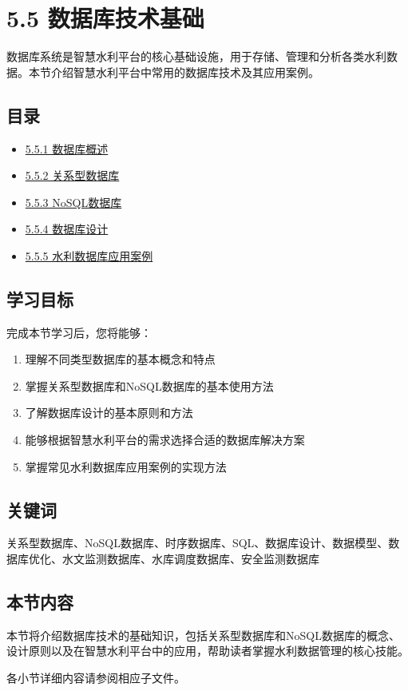 \section{5.5
数据库技术基础}\label{ux6570ux636eux5e93ux6280ux672fux57faux7840}

数据库系统是智慧水利平台的核心基础设施，用于存储、管理和分析各类水利数据。本节介绍智慧水利平台中常用的数据库技术及其应用案例。

\subsection{目录}\label{ux76eeux5f55}

\begin{itemize}
\tightlist
\item
  \href{section05-05/section05-05-01.md}{5.5.1 数据库概述}
\item
  \href{section05-05/section05-05-02.md}{5.5.2 关系型数据库}
\item
  \href{section05-05/section05-05-03.md}{5.5.3 NoSQL数据库}
\item
  \href{section05-05/section05-05-04.md}{5.5.4 数据库设计}
\item
  \href{section05-05/section05-05-05.md}{5.5.5 水利数据库应用案例}
\end{itemize}

\subsection{学习目标}\label{ux5b66ux4e60ux76eeux6807}

完成本节学习后，您将能够：

\begin{enumerate}
\def\labelenumi{\arabic{enumi}.}
\tightlist
\item
  理解不同类型数据库的基本概念和特点
\item
  掌握关系型数据库和NoSQL数据库的基本使用方法
\item
  了解数据库设计的基本原则和方法
\item
  能够根据智慧水利平台的需求选择合适的数据库解决方案
\item
  掌握常见水利数据库应用案例的实现方法
\end{enumerate}

\subsection{关键词}\label{ux5173ux952eux8bcd}

关系型数据库、NoSQL数据库、时序数据库、SQL、数据库设计、数据模型、数据库优化、水文监测数据库、水库调度数据库、安全监测数据库

\subsection{本节内容}\label{ux672cux8282ux5185ux5bb9}

本节将介绍数据库技术的基础知识，包括关系型数据库和NoSQL数据库的概念、设计原则以及在智慧水利平台中的应用，帮助读者掌握水利数据管理的核心技能。

各小节详细内容请参阅相应子文件。

